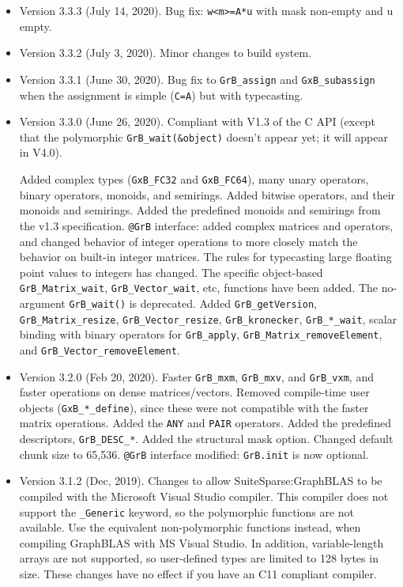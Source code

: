 \begin{itemize}
\item Version 3.3.3 (July 14, 2020).
    Bug fix: \verb'w<m>=A*u' with mask non-empty and u empty.

\item Version 3.3.2 (July 3, 2020).  Minor changes to build system.

\item Version 3.3.1 (June 30, 2020).  Bug fix to \verb'GrB_assign' and
    \verb'GxB_subassign' when the assignment is simple (\verb'C=A') but
    with typecasting.

\item Version 3.3.0 (June 26, 2020).  Compliant with V1.3 of the C API
    (except that the polymorphic \verb'GrB_wait(&object)' doesn't appear yet;
    it will appear in V4.0).

    Added complex types (\verb'GxB_FC32' and \verb'GxB_FC64'), many unary
    operators, binary operators, monoids, and semirings.  Added bitwise
    operators, and their monoids and semirings.  Added the predefined monoids
    and semirings from the v1.3 specification.  \verb'@GrB' interface: added complex
    matrices and operators, and changed behavior of integer operations to more
    closely match the behavior on built-in integer matrices.  The rules for
    typecasting large floating point values to integers has changed.  The
    specific object-based \verb'GrB_Matrix_wait', \verb'GrB_Vector_wait', etc,
    functions have been added.  The no-argument \verb'GrB_wait()' is
    deprecated.  Added \verb'GrB_getVersion', \verb'GrB_Matrix_resize',
    \verb'GrB_Vector_resize', \verb'GrB_kronecker', \verb'GrB_*_wait', scalar
    binding with binary operators for \verb'GrB_apply', \newline
    \verb'GrB_Matrix_removeElement', and \verb'GrB_Vector_removeElement'.

\item Version 3.2.0 (Feb 20, 2020).  Faster \verb'GrB_mxm', \verb'GrB_mxv', and
    \verb'GrB_vxm', and faster operations on dense matrices/vectors.  Removed
    compile-time user objects (\verb'GxB_*_define'), since these were not
    compatible with the faster matrix operations.  Added the \verb'ANY' and
    \verb'PAIR' operators.  Added the predefined descriptors,
    \verb'GrB_DESC_*'.  Added the structural mask option.  Changed default
    chunk size to 65,536.  \verb'@GrB' interface modified:  \verb'GrB.init' is
    now optional.

\item Version 3.1.2 (Dec, 2019).  Changes to allow SuiteSparse:GraphBLAS
    to be compiled with the Microsoft Visual Studio compiler.  This compiler
    does not support the \verb'_Generic' keyword, so the polymorphic functions
    are not available.  Use the equivalent non-polymorphic functions instead,
    when compiling GraphBLAS with MS Visual Studio.  In addition,
    variable-length arrays are not supported, so user-defined types are limited
    to 128 bytes in size.  These changes have no effect if you have an C11
    compliant compiler.


\end{itemize}
